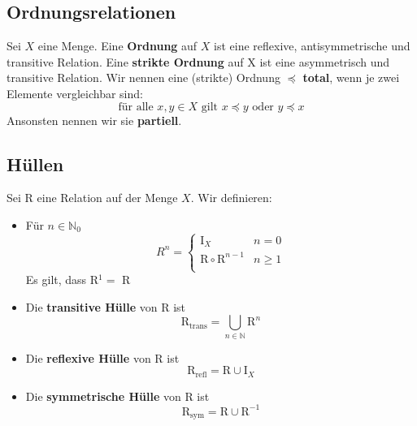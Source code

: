 \documentclass[12pt]{article}
\begin{document}
\subsection{Ordnungsrelationen}
Sei $X$ eine Menge. Eine \textbf{Ordnung} auf $X$ ist eine reflexive, antisymmetrische und transitive Relation. Eine \textbf{strikte Ordnung} auf X ist eine asymmetrisch und transitive Relation. Wir nennen eine (strikte) Ordnung $\preceq$ \textbf{total}, wenn je zwei Elemente vergleichbar sind: 
\[\text{für alle } x,y \in X \text{ gilt } x \preceq y \text{ oder } y \preceq x\]
Ansonsten nennen wir sie \textbf{partiell}.
\subsection{Hüllen}
Sei R eine Relation auf der Menge $X$. Wir definieren:
\begin{itemize}
    \item Für $n \in \mathbb{N}_0$ \[R^n = \begin{cases}
        \text{I}_X & n = 0 \\
        \text{R} \circ \text{R}^{n-1} & n \geq 1 \\
    \end{cases}\] Es gilt, dass R$^1 = $ R
    \item Die \textbf{transitive Hülle} von R ist \[\text{R}_{\text{trans}} = \bigcup_{n\in\mathbb{N}} \text{R}^n\]
    \item Die \textbf{reflexive Hülle} von R ist \[\text{R}_{\text{refl}} = \text{R} \cup \text{I}_X\]
    \item Die \textbf{symmetrische Hülle} von R ist \[\text{R}_{\text{sym}} = \text{R} \cup \text{R}^{-1}\]
\end{itemize}
\newpage
\end{document}
